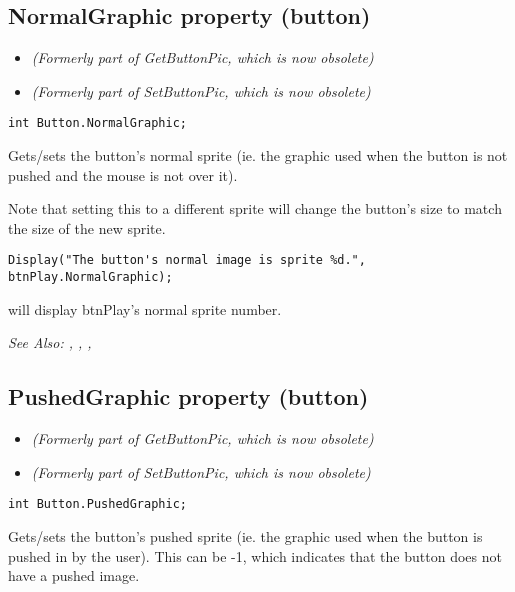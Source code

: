 \subsection{NormalGraphic property (button)}\label{Button.NormalGraphic}%

\begin{itemize}
\item \it{(Formerly part of GetButtonPic, which is now obsolete)}
\item \it{(Formerly part of SetButtonPic, which is now obsolete)}
\end{itemize}

\begin{verbatim}
int Button.NormalGraphic;
\end{verbatim}
Gets/sets the button's normal sprite (ie. the graphic used when the button is not pushed
and the mouse is not over it).

Note that setting this to a different sprite will change the button's size to match the size of the new sprite.

\begin{verbatim}
Display("The button's normal image is sprite %d.", btnPlay.NormalGraphic);
\end{verbatim}
will display btnPlay's normal sprite number.

\it{See Also:} 
,
,
,


\subsection{PushedGraphic property (button)}\label{Button.PushedGraphic}%

\begin{itemize}
\item \it{(Formerly part of GetButtonPic, which is now obsolete)}
\item \it{(Formerly part of SetButtonPic, which is now obsolete)}
\end{itemize}

\begin{verbatim}
int Button.PushedGraphic;
\end{verbatim}
Gets/sets the button's pushed sprite (ie. the graphic used when the button is pushed
in by the user). This can be -1, which indicates that the button does not have a pushed
image.

